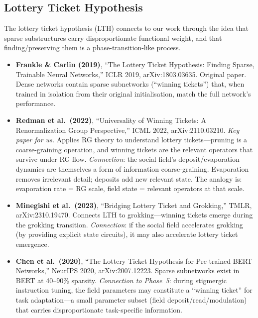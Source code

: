 \documentclass[11pt,a4paper]{article}
\begin{document}
\subsection{Lottery Ticket Hypothesis}

The lottery ticket hypothesis (LTH) connects to our work through the
idea that sparse substructures carry disproportionate functional weight,
and that finding/preserving them is a phase-transition-like process.

\begin{itemize}
    \item \textbf{Frankle \& Carlin (2019)}, ``The Lottery Ticket
          Hypothesis: Finding Sparse, Trainable Neural Networks,''
          ICLR 2019, arXiv:1803.03635.  Original paper.  Dense networks
          contain sparse subnetworks (``winning tickets'') that, when
          trained in isolation from their original initialisation,
          match the full network's performance.

    \item \textbf{Redman et al.\ (2022)}, ``Universality of Winning
          Tickets: A Renormalization Group Perspective,'' ICML 2022,
          arXiv:2110.03210.  \emph{Key paper for us.}  Applies RG theory
          to understand lottery tickets---pruning is a coarse-graining
          operation, and winning tickets are the relevant operators that
          survive under RG flow.  \emph{Connection}: the social field's
          deposit/evaporation dynamics are themselves a form of
          information coarse-graining.  Evaporation removes irrelevant
          detail; deposits add new relevant state.  The analogy is:
          evaporation rate = RG scale, field state = relevant operators
          at that scale.

    \item \textbf{Minegishi et al.\ (2023)}, ``Bridging Lottery Ticket
          and Grokking,'' TMLR, arXiv:2310.19470.  Connects LTH to
          grokking---winning tickets emerge during the grokking
          transition.  \emph{Connection}: if the social field accelerates
          grokking (by providing explicit state circuits), it may also
          accelerate lottery ticket emergence.

    \item \textbf{Chen et al.\ (2020)}, ``The Lottery Ticket Hypothesis
          for Pre-trained BERT Networks,'' NeurIPS 2020,
          arXiv:2007.12223.  Sparse subnetworks exist in BERT at
          40--90\% sparsity.  \emph{Connection to Phase~5}: during
          stigmergic instruction tuning, the field parameters may
          constitute a ``winning ticket'' for task adaptation---a small
          parameter subset (field deposit/read/modulation) that carries
          disproportionate task-specific information.


\end{itemize}
\end{document}
